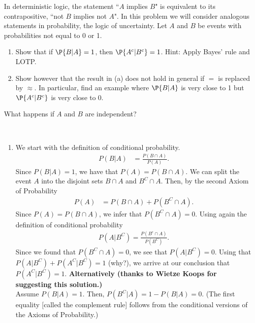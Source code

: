 

\setcounter{theorem}{11}
\begin{exercise}[BH.2.12] 
In deterministic logic, the statement ``$A$ implies $B$" is equivalent to its contrapositive, ``not $B$ implies not $A$". In this problem we will consider analogous statements in probability, the logic of uncertainty. Let $A$ and $B$ be events with probabilities not equal to 0 or 1.
	\begin{enumerate}
		\item Show that if $\P{B|A} = 1$, then $\P{A^c|B^c} = 1$. Hint: Apply Bayes' rule and LOTP.
		\item Show however that the result in (a) does not hold in general if $=$ is replaced by $\approx$. In particular, find an example where $\P{B|A}$ is very close to 1 but $\P{A^c|B^c}$ is very close to 0.
	\end{enumerate}
\begin{hint}
	What happens if $A$ and $B$ are independent?
\end{hint}
\begin{solution}~
	\begin{enumerate}
		\item We start with the definition of conditional probability.
		\begin{align*}
			P(B|A)& = \frac{P(B\cap A)}{P(A)}.
		\end{align*}
		Since $P(B|A)=1$, we have that $P(A) = P(B\cap A)$. We can split the event $A$ into the disjoint sets $B\cap A$ and $B^{C}\cap A$. Then, by the second Axiom of Probability
		\begin{align*}
			P(A) &= P(B\cap A) +P(B^{C}\cap A).
		\end{align*}
		Since  $P(A) = P(B\cap A)$, we infer that $P(B^{C}\cap A)=0$. Using again the definition of conditional probability
		\begin{align*}
			P(A|B^{C})=\frac{P(B^{c}\cap A)}{P(B^C)}.
		\end{align*}
		Since we found that $P(B^{C}\cap A)=0$, we see that $P(A|B^{C})=0$. Using that $P(A|B^{C}) + P(A^{C}|B^{C})=1$ (why?), we arrive at our conclusion that $P(A^{C}|B^{C})=1$. \newline\newline
		\textbf{Alternatively (thanks to Wietze Koops for suggesting this solution.)}\\
		Assume $P(B|A)=1$. Then, $P(B^{C}|A) = 1-P(B|A) = 0$. (The first equality [called the complement rule] follows from the conditional versions of the Axioms of Probability.)\\

\end{enumerate}
\end{solution}
\end{exercise}
